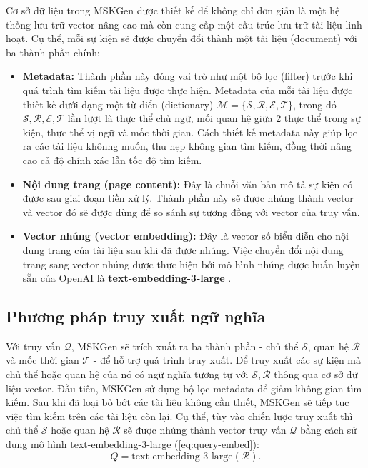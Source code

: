 Cơ sở dữ liệu trong MSKGen được thiết kế để không chỉ đơn giản là một hệ thống lưu trữ vector nâng cao mà còn cung cấp một cấu trúc lưu trữ tài liệu linh hoạt. Cụ thể, mỗi sự kiện sẽ được chuyển đổi thành một tài liệu (document) với ba thành phần chính:
\begin{itemize}
    \item \textbf{Metadata:} Thành phần này đóng vai trò như một bộ lọc (filter) trước khi quá trình tìm kiếm tài liệu được thực hiện. Metadata của mỗi tài liệu được thiết kế dưới dạng một từ điển (dictionary) $\mathcal{M} = \{\mathcal{S, R, E, T}\}$, trong đó $\mathcal{S, R, E, T}$ lần lượt là thực thể chủ ngữ, mối quan hệ giữa 2 thực thể trong sự kiện, thực thể vị ngữ và mốc thời gian. Cách thiết kế metadata này giúp lọc ra các tài liệu khônng muốn, thu hẹp không gian tìm kiếm, đồng thời nâng cao cả độ chính xác lẫn tốc độ tìm kiếm.
    \item \textbf{Nội dung trang (page content):} Đây là chuỗi văn bản mô tả sự kiện có được sau giai đoạn tiền xử lý. Thành phần này sẽ được nhúng thành vector và vector đó sẽ được dùng để so sánh sự tương đồng với vector của truy vấn.
    \item \textbf{Vector nhúng (vector embedding):} Đây là vector số biểu diễn cho nội dung trang của tài liệu sau khi đã được nhúng. Việc chuyển đổi nội dung trang sang vector nhúng được thực hiện bởi mô hình nhúng được huấn luyện sẵn của OpenAI là \textbf{text-embedding-3-large} \cite{ref_article18}.
\end{itemize}

\vspace{1em}
\subsection{Phương pháp truy xuất ngữ nghĩa}

Với truy vấn $\mathcal{Q}$, MSKGen sẽ trích xuất ra ba thành phần - chủ thể $\mathcal{S}$, quan hệ $\mathcal{R}$ và mốc thời gian $\mathcal{T}$ - để hỗ trợ quá trình truy xuất. Để truy xuất các sự kiện mà chủ thể hoặc quan hệ của nó có ngữ nghĩa tương tự với $\mathcal{S, R}$ thông qua cơ sở dữ liệu vector. Đầu tiên, MSKGen sử dụng bộ lọc metadata để giảm không gian tìm kiếm. Sau khi đã loại bỏ bớt các tài liệu không cần thiết, MSKGen sẽ tiếp tục việc tìm kiếm trên các tài liệu còn lại. Cụ thể, tùy vào chiến lược truy xuất thì chủ thể $\mathcal{S}$ hoặc quan hệ $\mathcal{R}$ sẽ được nhúng thành vector truy vấn $\mathcal{Q}$ bằng cách sử dụng mô hình text-embedding-3-large (\ref{eq:query-embed}):
\begin{equation}  
\label{eq:query-embed}  
Q = \text{text-embedding-3-large}(\mathcal{R}). 
\end{equation}

